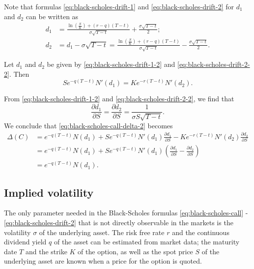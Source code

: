 Note that formulas \eqref{eq:black-scholes-drift-1} and
    \eqref{eq:black-scholes-drift-2} for $ d_1 $ and $ d_2 $ can be written as
\begin{align}
    d_1 &= \frac{\ln \left( \frac{S}{K} \right) + (r - q) (T - t)}{\sigma
        \sqrt{T - t}} + \frac{\sigma \sqrt{T - t}}{2};
        \label{eq:black-scholes-drift-1-2} \\
    d_2 &= d_1 - \sigma \sqrt{T - t} = \frac{\ln \left( \frac{S}{K} \right) +
        (r - q)(T - t)}{\sigma \sqrt{T - t}} - \frac{\sigma \sqrt{T - t}}{2}.
        \label{eq:black-scholes-drift-2-2}
\end{align}
\begin{lemma}
    Let $ d_1 $ and $ d_2 $ be given by \eqref{eq:black-scholes-drift-1-2} and
        \eqref{eq:black-scholes-drift-2-2}.
    Then
    \begin{equation}
        S e^{-q(T-t)} N'(d_1) = K e^{-r(T-t)} N'(d_2).
    \end{equation}
\end{lemma}
From \eqref{eq:black-scholes-drift-1-2} and
    \eqref{eq:black-scholes-drift-2-2}, we find that
\begin{equation}
    \frac{\partial d_1}{\partial S} = \frac{\partial d_2}{\partial S} =
        \frac{1}{\sigma S \sqrt{T - t}}.
\end{equation}
We conclude that \eqref{eq:black-scholes-call-delta-2} becomes
\begin{align*}
    \Delta(C)
        &= e^{-q(T-t)} N(d_1) + S e^{-q(T-t)} N'(d_1)
            \frac{\partial d_1}{\partial S} - K e^{-r(T-t)} N'(d_2)
            \frac{\partial d_2}{\partial S} \\
        &= e^{-q(T-t)} N(d_1) + S e^{-q(T-t)} N'(d_1)
            \left( \frac{\partial d_1}{\partial S} -
            \frac{\partial d_2}{\partial S} \right) \\
        &= e^{-q(T-t)} N(d_1).
\end{align*}

\subsection{Implied volatility}

The only parameter needed in the Black-Scholes formulas
    \eqref{eq:black-scholes-call} - \eqref{eq:black-scholes-drift-2} that is
    not directly observable in the markets is the volatility $ \sigma $ of the
    underlying asset.
The risk free rate $ r $ and the continuous dividend yield $ q $ of the asset
    can be estimated from market data; the maturity date $ T $ and the strike
    $ K $ of the option, as well as the spot price $ S $ of the underlying
    asset are known when a price for the option is quoted.

